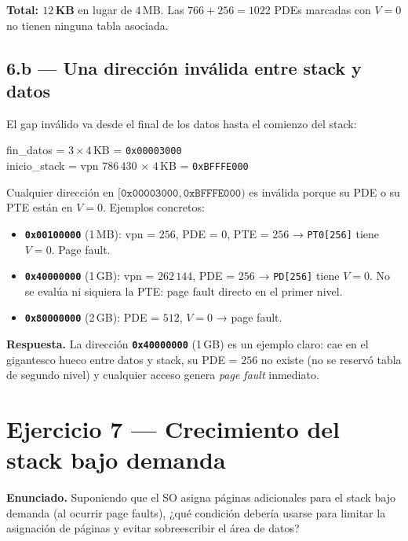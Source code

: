 \documentclass[11pt,a4paper]{article}
\begin{document}
\textbf{Total: $12$\,KB} en lugar de $4$\,MB. Las $766 + 256 = 1022$
PDEs marcadas con $V=0$ no tienen ninguna tabla asociada.

\subsection{6.b --- Una dirección inválida entre stack y datos}

El gap inválido va desde el final de los datos hasta el comienzo del
stack:

\quad fin\_datos = $3 \times 4$\,KB = \texttt{0x00003000} \\
\quad inicio\_stack = vpn $786\,430$ × $4$\,KB = \texttt{0xBFFFE000}

Cualquier dirección en $[\texttt{0x00003000}, \texttt{0xBFFFE000})$ es
inválida porque su PDE o su PTE están en $V=0$. Ejemplos concretos:

\begin{itemize}[leftmargin=*,nosep]
    \item \textbf{\texttt{0x00100000}} (1\,MB): vpn = $256$, PDE = $0$,
        PTE = $256$ → \texttt{PT0[256]} tiene $V=0$. Page fault.
    \item \textbf{\texttt{0x40000000}} (1\,GB): vpn = $262\,144$,
        PDE = $256$ → \texttt{PD[256]} tiene $V=0$. No se evalúa ni
        siquiera la PTE: page fault directo en el primer nivel.
    \item \textbf{\texttt{0x80000000}} (2\,GB): PDE = $512$, $V=0$ →
        page fault.
\end{itemize}

\textbf{Respuesta.} La dirección \textbf{\texttt{0x40000000}} (1\,GB)
es un ejemplo claro: cae en el gigantesco hueco entre datos y stack,
su PDE = $256$ no existe (no se reservó tabla de segundo nivel) y
cualquier acceso genera \emph{page fault} inmediato.

\section{Ejercicio 7 --- Crecimiento del stack bajo demanda}

\textbf{Enunciado.} Suponiendo que el SO asigna páginas adicionales
para el stack bajo demanda (al ocurrir page faults), ¿qué condición
debería usarse para limitar la asignación de páginas y evitar
sobreescribir el área de datos?
\end{document}
